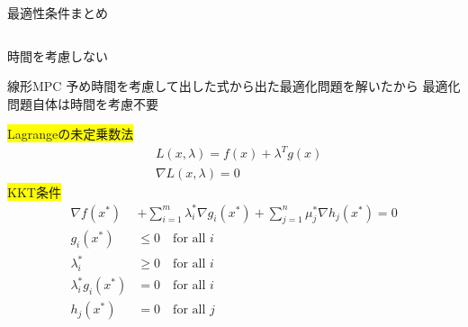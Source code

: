 \documentclass[twocolumn, dvipdfmx,12pt]{beamer}
\begin{document}
    \begin{frame}{最適性条件まとめ}
        \fontsize{6.5pt}{6.5pt}\selectfont
        
        \begin{columns}
            \begin{column}{.6\textwidth}
                \begin{itembox}[l]{時間を考慮しない}
                    \begin{itembox}[l]{線形MPC}
                        予め時間を考慮して出した式から出た最適化問題を解いたから
                        最適化問題自体は時間を考慮不要\\
                    \end{itembox}
                    \colorbox{yellow}{Lagrangeの未定乗数法}\\
                    \begin{align*}
                        &L(x, \lambda) = f(x) + \lambda^T g(x)\\
                        &\nabla L(x, \lambda)=0
                    \end{align*}
                    \colorbox{yellow}{KKT条件}\\
                    \begin{align*}
                        \nabla f(x^*) &+ \sum_{i=1}^m \lambda_i^* \nabla g_i(x^*) + \sum_{j=1}^n \mu_j^* \nabla h_j(x^*) = 0 \\
                        g_i(x^*) &\leq 0 \quad \text{for all } i \\
                        \lambda_i^* &\geq 0 \quad \text{for all } i \\
                        \lambda_i^* g_i(x^*) &= 0 \quad \text{for all } i \\
                        h_j(x^*) &= 0 \quad \text{for all } j
                    \end{align*}
                \end{itembox}
            \end{column}


\end{columns}
\end{frame}
\end{document}
